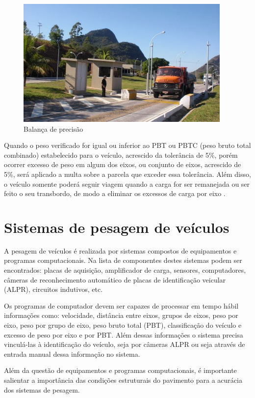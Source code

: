 \documentclass{ufscThesis}
\begin{document}
\begin{figure}[h!]
  \caption{Balança de precisão}
  \label{fig:balanca-precisao}
  \centering
    \includegraphics[scale=0.7]{./figuras/balanca-de-precisao.jpg}
\end{figure}

Quando o peso verificado for igual ou inferior ao PBT ou PBTC (peso bruto total combinado) estabelecido para o veículo, acrescido da tolerância de 5\%, porém ocorrer excesso de peso em algum dos eixos, ou conjunto de eixos, acrescido de 5\%, será aplicado a multa sobre a parcela que exceder essa tolerância. Além disso, o veículo somente poderá seguir viagem quando a carga for ser remanejada ou ser feito o seu transbordo, de modo a eliminar os excessos de carga por eixo \cite{tech:dnit-ppv-guia-pratico-operacao}.

\section{Sistemas de pesagem de veículos}\label{sec:ppv-sistemas}
A pesagem de veículos é realizada por sistemas compostos de equipamentos e programas computacionais. Na lista de componentes destes sistemas podem ser encontrados: placas de aquisição, amplificador de carga, sensores, computadores, câmeras de reconhecimento automático de placas de identificação veicular (ALPR), circuitos indutivos, etc. 

Os programas de computador devem ser capazes de processar em tempo hábil informações como: velocidade, distância entre eixos, grupos de eixos, peso por eixo, peso por grupo de eixo, peso bruto total (PBT), classificação do veículo e excesso de peso por eixo e por PBT. Além dessas informações o sistema precisa vinculá-las à identificação do veículo, seja por câmeras ALPR ou seja através de entrada manual dessa informação no sistema.

Além da questão de equipamentos e programas computacionais, é importante salientar a importância das condições estruturais do pavimento para a acurácia dos sistemas de pesagem.
\end{document}
